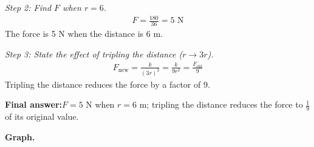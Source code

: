 \documentclass[11pt]{article}
\begin{document}
\textit{Step 2: Find \( F \) when \( r = 6 \).}
\[\begin{gathered}
F = \frac{180}{36} = 5 \text{ N}
\end{gathered}\]
The force is 5 N when the distance is 6 m.

\textit{Step 3: State the effect of tripling the distance (\( r \to 3r \)).}
\[\begin{gathered}
F_{\text{new}} = \frac{k}{(3r)^2} = \frac{k}{9r^2} = \frac{F_{\text{old}}}{9}
\end{gathered}\]
Tripling the distance reduces the force by a factor of 9.

\begin{answerbox}
\textbf{Final answer:}\quad \(\displaystyle  F = 5 \) N when \(\displaystyle  r = 6 \) m; tripling the distance reduces the force to \(\displaystyle  \frac{1}{9} \) of its original value.
\end{answerbox}
\textbf{Graph.}
\end{document}
